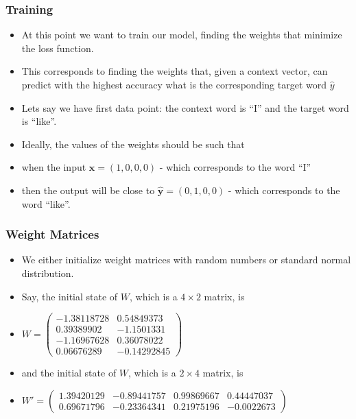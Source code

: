 \begin{frame}[fragile]\frametitle{Training}
  \begin{itemize}
    \item At this point we want to train our model, finding the weights that minimize the loss function. 
	\item This corresponds to finding the weights that, given a context vector, can predict with the highest accuracy what is the corresponding target word $\hat{y}$
	\item Lets say we have first data point: the context word is “I” and the target word is “like”. 
	\item Ideally, the values of the weights should be such that 
	\item when the input $\textbf{x}=(1, 0, 0, 0)$  - which corresponds to the word “I” 
	\item then the output will be close to  $\hat{\textbf{y}}=(0, 1, 0, 0)$  - which corresponds to the word “like”.
  \end{itemize}
 
\end{frame}

\begin{frame}[fragile]\frametitle{Weight Matrices}
  \begin{itemize}
    \item We either initialize weight matrices with random numbers or  standard normal distribution.

\item Say, the initial state of $W$, which is a $4 \times 2$ matrix, is
\item $W =
\begin{pmatrix}
	-1.38118728 &  0.54849373 \\
	0.39389902  &  -1.1501331	\\
	-1.16967628 &  0.36078022 \\
	0.06676289  &  -0.14292845
\end{pmatrix}
$

\item and the initial state of $W$, which is a $2 \times 4$ matrix, is

\item $
W' =
\begin{pmatrix}
	1.39420129	& -0.89441757 &  0.99869667 &  0.44447037 \\
	0.69671796 & -0.23364341 & 0.21975196 & -0.0022673
\end{pmatrix}
$

\end{itemize}

\end{frame}

